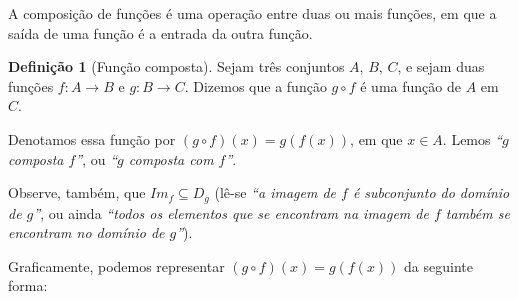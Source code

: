 \documentclass[12pt,openright,twoside,a4paper]{article}
\theoremstyle{definition}
\newtheorem{definition}{Definição}[section]
\begin{document}
	A composição de funções é uma operação entre duas ou mais funções, em que a saída de uma função é a entrada da outra função.
	
	\begin{definition}[Função composta]
		Sejam três conjuntos $A,\, B,\, C$, e sejam duas funções $f: A \longrightarrow B$ e $g: B \longrightarrow C$. Dizemos que a função $g \circ f$ é uma função de $A$ em $C$.
		
		Denotamos essa função por $(g \circ f)(x) = g(f(x))$, em que $x \in A$. Lemos \textit{``$g$ composta $f$''}, ou \textit{``$g$ composta com $f$''}. 
		
		Observe, também, que $Im_f \subseteq D_g$ (lê-se \textit{``a imagem de $f$ é subconjunto do domínio de $g$''}, ou ainda \textit{``todos os elementos que se encontram na imagem de $f$ também se encontram no domínio de $g$''}).
	\end{definition}

	
	Graficamente, podemos representar $(g \circ f)(x) = g(f(x))$ da seguinte forma:
	
\end{document}
